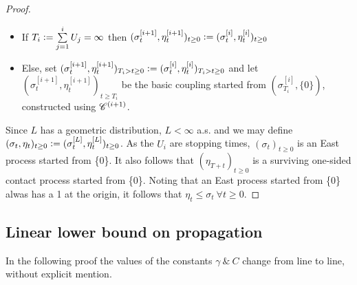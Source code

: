 \begin{proof}
\begin{enumerate}
\begin{itemize}
    \item If $T_i \vcentcolon= \sum\limits^i_{j=1} U_j = \infty$ then $(\sigma^{[i+1]}_t, \eta^{[i+1]}_t)_{t \geq 0} \vcentcolon= (\sigma^{[i]}_t, \eta^{[i]}_t)_{t \geq 0}$
    \item Else, set $(\sigma^{[i+1]}_t, \eta^{[i+1]}_t)_{T_i > t \geq 0} \vcentcolon= (\sigma^{[i]}_t, \eta^{[i]}_t)_{T_i > t \geq 0}$ and let $(\sigma^{[i+1]}_t, \eta^{[i+1]}_t)_{t \geq T_i}$ be the basic coupling started from $(\sigma^{[i]}_{T_i}, \{0\})$, constructed using $\mathscr{C}^{(i+1)}$. 
  \end{itemize}
\end{enumerate}
Since $L$ has a geometric distribution, $L < \infty$ a.s. and we may define $(\sigma_t, \eta_t)_{t \geq 0} \vcentcolon= (\sigma^{[L]}_t, \eta^{[L]}_t)_{t \geq 0}$. As the $U_i$ are stopping times, $(\sigma_t)_{t \geq 0}$ is an East process started from \{0\}. It also follows that $(\eta_{T+t})_{t \geq 0}$ is a surviving one-sided contact process started from \{0\}. Noting that an East process started from \{0\} alwas has a 1 at the origin, it follows that $\eta_t \leq \sigma_t\ \forall t \geq 0$. 
\end{proof}

\subsection{Linear lower bound on propagation}

\begin{remark}
In the following proof the values of the constants $\gamma\ \&\ C$ change from line to line, without explicit mention. 
\end{remark}

